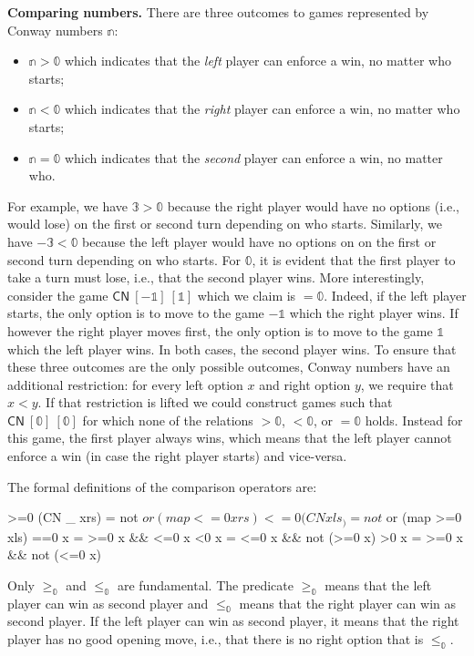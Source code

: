 \documentclass[authoryear,preprint]{sigplanconf}
\newcommand{\zerog}{\mathbb{0}}
\newcommand{\oneg}{\mathbb{1}}
\newcommand{\threeg}{\mathbb{3}}
\begin{document}
\textbf{Comparing numbers.} There are three outcomes to games represented by
Conway numbers $\mathbb{n}$:
\begin{itemize}
\item $\mathbb{n} > \zerog$ which indicates that the \emph{left} player can
  enforce a win, no matter who starts;
\item $\mathbb{n} < \zerog$ which indicates that the \emph{right} player can
  enforce a win, no matter who starts;
\item $\mathbb{n} = \zerog$ which indicates that the \emph{second}
  player can enforce a win, no matter who.
\end{itemize}
For example, we have $\threeg > \zerog$ because the right player would have
no options (i.e., would lose) on the first or second turn depending on who
starts. Similarly, we have $-\threeg < \zerog$ because the left player would
have no options on on the first or second turn depending on who starts. For
$\zerog$, it is evident that the first player to take a turn must lose, i.e.,
that the second player wins. More interestingly, consider the game
$\textsf{CN}~[-\oneg]~[\oneg]$ which we claim is $= \zerog$. Indeed, if the
left player starts, the only option is to move to the game $-\oneg$ which the
right player wins. If however the right player moves first, the only option
is to move to the game $\oneg$ which the left player wins. In both cases, the
second player wins. To ensure that these three outcomes are the only possible
outcomes, Conway numbers have an additional restriction: for every left
option $x$ and right option $y$, we require that $x < y$. If that restriction
is lifted we could construct games such that $\textsf{CN}~[\zerog]~[\zerog]$
for which none of the relations $> \zerog$, $< \zerog$, or $= \zerog$
holds. Instead for this game, the first player always wins, which means that
the left player cannot enforce a win (in case the right player starts) and
vice-versa.

The formal definitions of the comparison operators are:
\begin{code}
>=0 (CN _ xrs)  = not $ or (map <=0 xrs)
<=0 (CN xls _)  = not $ or (map >=0 xls) 
==0 x           = >=0 x && <=0 x
<0 x            = <=0 x && not (>=0 x)
>0 x            = >=0 x && not (<=0 x)
\end{code}
Only $\geq_\zerog$ and $\leq_\zerog$ are fundamental. The predicate
$\geq_\zerog$ means that the left player can win as second player and
$\leq_\zerog$ means that the right player can win as second player. If the
left player can win as second player, it means that the right player has no
good opening move, i.e., that there is no right option that is $\leq_\zerog$.
\end{document}
